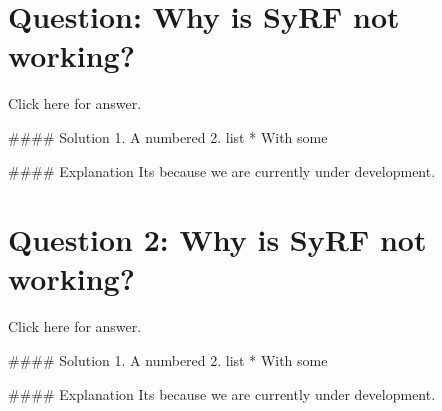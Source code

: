 \documentclass[]{book}
\begin{document}
\section{Question: Why is SyRF not
working?}\label{question-why-is-syrf-not-working}

 Click here for answer.

\#\#\#\# Solution 1. A numbered 2. list * With some

\#\#\#\# Explanation Its because we are currently under development.

\section{Question 2: Why is SyRF not
working?}\label{question-2-why-is-syrf-not-working}

 Click here for answer.

\#\#\#\# Solution 1. A numbered 2. list * With some

\#\#\#\# Explanation Its because we are currently under development.


\end{document}

